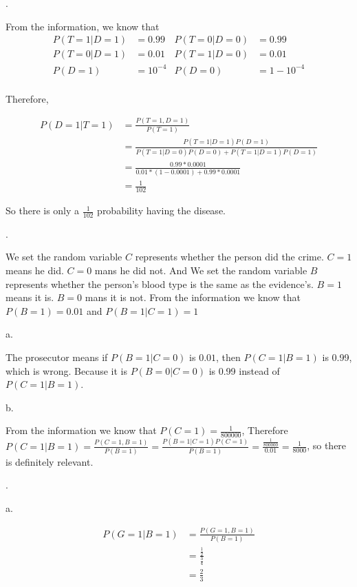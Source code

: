 \documentclass[UTF8]{article}
\begin{document}
.

From the information, we know that
\begin{equation*}
\begin{aligned}
    P(T=1|D=1) &= 0.99&P(T=0|D=0)&= 0.99\\
    P(T=0|D=1) &= 0.01&P(T=1|D=0)&= 0.01\\
    P(D=1) &= 10^{-4}&P(D=0) &= 1-10^{-4}\\
\end{aligned}
\end{equation*}

Therefore, 

\begin{align*}
    P(D=1|T=1) &= \frac{P(T=1,D=1)}{P(T=1)}\\
               &= \frac{P(T=1|D=1)P(D=1)}{P(T=1|D=0)P(D=0)+P(T=1|D=1)P(D=1)}\\
               &= \frac{0.99*0.0001}{0.01*(1-0.0001)+0.99*0.0001}\\
               &= \frac{1}{102}
\end{align*}

So there is only a $\frac{1}{102}$ probability having the disease.

.

We set the random variable $C$ represents whether the person did the crime. $C=1$ means he did. $C=0$ mans he did not. And
We set the random variable $B$ represents whether the person's blood type is the same as the evidence's. $B=1$ means it is. $B=0$ mans it is not. From
the information we know that$P(B=1)=0.01$ and $P(B=1|C=1)=1$

\noindent a.

The prosecutor means if $P(B=1|C=0)$ is $0.01$, then $P(C=1|B=1)$ is 0.99, which is wrong. Because it is $P(B=0|C=0)$ is 0.99 instead of
$P(C=1|B=1)$.

\noindent b.

From the information we know that $P(C=1) = \frac{1}{800000}$, Therefore $P(C=1|B=1) = \frac{P(C=1, B=1)}{P(B=1)}=\frac{P(B=1|C=1)P(C=1)}{P(B=1)} = \frac{\frac{1}{800000}}{0.01}=\frac{1}{8000}$, so there is
definitely relevant.

.

\noindent a.

\begin{align*}
    P(G=1|B=1) &=  \frac{P(G=1, B=1)}{P(B=1)}\\
    &=\frac{\frac{1}{2}}{\frac{3}{4}}\\
    &=\frac{2}{3}
\end{align*}
\end{document}
